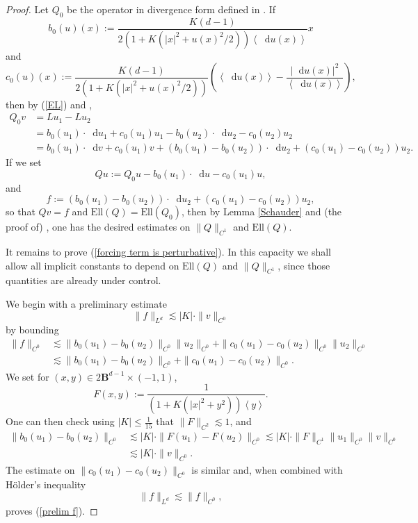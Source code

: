 \documentclass[reqno,11pt]{amsart}
\newcommand{\Ball}{\mathbf{B}}
\newcommand*\dif{\mathop{}\!\mathrm{d}}
\newcommand{\Ell}{\mathrm{Ell}}
\def\Japan#1{\left \langle #1 \right \rangle}
\theoremstyle{definition}
\numberwithin{equation}{section}
\begin{document}
\begin{proof}
Let $Q_0$ be the operator in divergence form defined in \cite[(1.126)]{colding2011course}.
If
$$b_0(u)(x) := \frac{K(d - 1)}{2(1 + K(|x|^2 + u(x)^2/2))\Japan{\dif u(x)}} x$$
and 
$$c_0(u)(x) := \frac{K(d - 1)}{2(1 + K(|x|^2 + u(x)^2/2))} \left(\Japan{\dif u(x)} - \frac{|\dif u(x)|^2}{\Japan{\dif u(x)}}\right),$$
then by (\ref{EL}) and \cite[(1.125)]{colding2011course},
\begin{align*}
	Q_0 v &= Lu_1 - Lu_2 \\
	&= b_0(u_1) \cdot \dif u_1 + c_0(u_1) u_1 - b_0(u_2) \cdot \dif u_2 - c_0(u_2) u_2 \\
	&= b_0(u_1) \cdot \dif v + c_0(u_1) v + (b_0(u_1) - b_0(u_2)) \cdot \dif u_2 + (c_0(u_1) - c_0(u_2)) u_2.
\end{align*}
If we set
$$Qu := Q_0u - b_0(u_1) \cdot \dif u - c_0(u_1)u,$$
and
$$f := (b_0(u_1) - b_0(u_2)) \cdot \dif u_2 + (c_0(u_1) - c_0(u_2)) u_2,$$
so that $Qv = f$ and $\Ell(Q) = \Ell(Q_0)$, then by Lemma \ref{Schauder} and (the proof of) \cite[Lemma 1.26]{colding2011course}, one has the desired estimates on $\|Q\|_{C^1}$ and $\Ell(Q)$.

It remains to prove (\ref{forcing term is perturbative}).
In this capacity we shall allow all implicit constants to depend on $\Ell(Q)$ and $\|Q\|_{C^1}$, since those quantities are already under control.

We begin with a preliminary estimate
\begin{equation}\label{prelim f}
\|f\|_{L^d} \lesssim |K| \cdot \|v\|_{C^0}
\end{equation}
by bounding
\begin{align*}
\|f\|_{C^0} 
&\lesssim \|b_0(u_1) - b_0(u_2)\|_{C^0} \|u_2\|_{C^0} + \|c_0(u_1) - c_0(u_2)\|_{C^0} \|u_2\|_{C^0} \\
&\lesssim \|b_0(u_1) - b_0(u_2)\|_{C^0} + \|c_0(u_1) - c_0(u_2)\|_{C^0}.
\end{align*}
We set for $(x, y) \in 2\Ball^{d - 1} \times (-1, 1)$,
$$F(x, y) := \frac{1}{(1 + K(|x|^2 + y^2))\Japan y}.$$
One can then check using $|K| \leq \frac{1}{15}$ that $\|F\|_{C^2} \lesssim 1$, and 
\begin{align*}
\|b_0(u_1) - b_0(u_2)\|_{C^0}
&\lesssim |K| \cdot \|F(u_1) - F(u_2)\|_{C^0} \lesssim |K| \cdot \|F\|_{C^1} \|u_1\|_{C^0} \|v\|_{C^0} \\
&\lesssim |K| \cdot \|v\|_{C^0}.
\end{align*}
The estimate on $\|c_0(u_1) - c_0(u_2)\|_{C^0}$ is similar and, when combined with H\"older's inequality
$$\|f\|_{L^d} \lesssim \|f\|_{C^0},$$
proves (\ref{prelim f}).


\end{proof}
\end{document}
